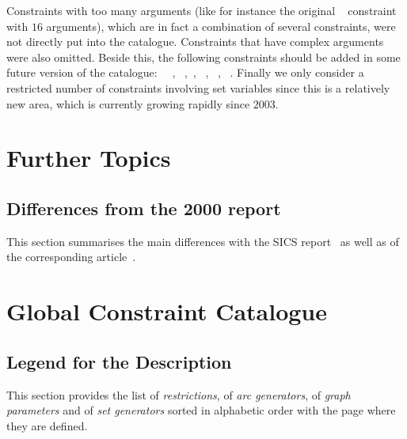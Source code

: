 Constraints with too many arguments (like for instance the original \hyperlink{Ccycle}{}~\cite{Cosytec97} constraint with $16$ arguments), which are in fact a combination of several constraints, were not directly put into the catalogue. Constraints that have complex arguments were also omitted. Beside this, the following constraints should be added in some future version of the catalogue:
~\cite{QuimperWalsh05}~\cite{QuimperWalshReport05},
~\cite{Sicstus95,Carlsson06},~\cite{ChengYap05,ChengYap06},
~\cite{LeHuedeGrabischLabreucheSaveant06},
~\cite{DemasseyPesantRousseau06},
~\cite{PoderBeldiceanuSanlaville04,BeldiceanuPoderPMS04}.
Finally we only consider a restricted number of constraints involving set variables since this is a relatively new area, which is currently growing rapidly since $2003$.

\chapter{Further Topics}\label{chap:further_topics}

\minitoc

\section{Differences from the 2000 report}

This section summarises the main differences with the SICS report~\cite{Beldiceanu00} as well as of the corresponding article~\cite{BeldiceanuR00}.

\chapter{Global Constraint Catalogue}\label{chap:catalogue}
\minitoc
\pagestyle{myheadings}



\pagestyle{headings}
\begin{appendix}
\chapter{Legend for the Description}\label{chap:legend}

This section provides the list of \emph{restrictions}, of \emph{arc generators}, of \emph{graph parameters} and of \emph{set generators} sorted in alphabetic order with the page where they are defined.

\end{appendix}
\backmatter



